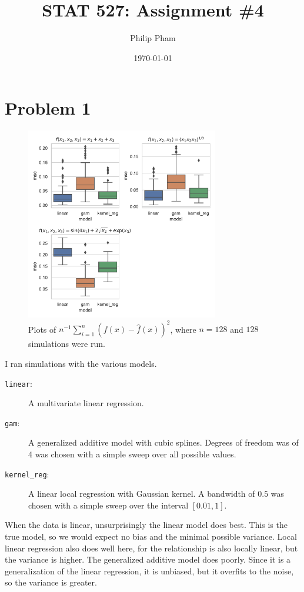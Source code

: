 \documentclass[letterpaper]{article}
\title{STAT 527: Assignment \#4}
\author{Philip Pham}
\date{\today}
\begin{document}
\maketitle

\section*{Problem 1}

\begin{figure}[h!]
  \centering
  \caption{Plots of $n^{-1}\sum_{i=1}^n \left(f(x) - \hat{f}(x)\right)^2$, where
    $n = 128$ and $128$ simulations were run.}
  \includegraphics[width=0.75\textwidth]{mse.pdf}
\end{figure}

I ran simulations with the various models.
\begin{description}
\item[\texttt{linear}:] A multivariate linear regression.
\item[\texttt{gam}:] A generalized additive model with cubic splines. Degrees of
  freedom was of 4 was chosen with a simple sweep over all possible values.
\item[\texttt{kernel\_reg}:] A linear local regression with Gaussian kernel. A
  bandwidth of $0.5$ was chosen with a simple sweep over the interval
  $[0.01, 1]$.  
\end{description}

When the data is linear, unsurprisingly the linear model does best. This is
the true model, so we would expect no bias and the minimal possible
variance. Local linear regression also does well here, for the relationship is
also locally linear, but the variance is higher. The generalized additive
model does poorly. Since it is a generalization of the linear regression, it
is unbiased, but it overfits to the noise, so the variance is greater.
\end{document}

